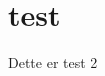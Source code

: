 \documentclass[../MasterThesis.tex]{subfiles}
\begin{document}
\section{test}
Dette er test 2 
\end{document}
